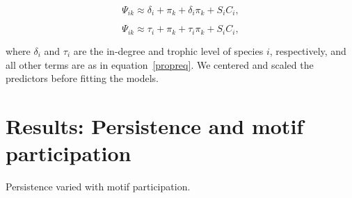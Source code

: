 \documentclass[12pt]{article}
\begin{document}
\begin{spacing}{2.0}
      
            \begin{equation}
                    \Psi_{ik} \approx \delta_{i} + \pi_{k} + \delta_{i}\pi_{k} +
                    S_{i}C_{i} ,
                    \label{degeq}
                \end{equation}
        
            \begin{equation}
                    \Psi_{ik} \approx \tau_{i} + \pi_{k} + \tau_{i}\pi_{k} +
                    S_{i}C_{i} ,
                    \label{TLeq}
                \end{equation}
        
            where $\delta_{i}$ and $\tau_i$ are the in-degree and trophic level of species $i$, respectively, and all other terms are as in equation~\ref{propreq}.
            We centered and scaled the predictors before fitting the models.

\clearpage

\section{Results: Persistence and motif participation}

    Persistence varied with motif participation.


\end{spacing}
\end{document}
